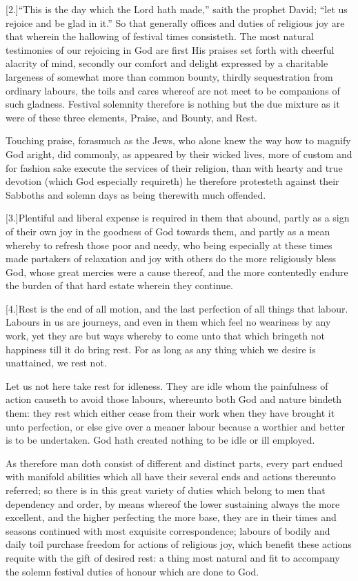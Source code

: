 [2.]“This is the day which the Lord hath made,” saith the prophet David; “let us rejoice and be glad in it.” So  that generally offices and duties of religious joy are that wherein the hallowing of festival times consisteth.
 The most natural testimonies of our rejoicing in God are first His praises set forth with cheerful alacrity of mind, secondly our comfort and delight expressed by a charitable largeness of somewhat more than common bounty, thirdly sequestration from ordinary labours, the toils and cares whereof are not meet to be companions of such gladness. Festival solemnity therefore is nothing but the due mixture as it were of these three elements, Praise, and Bounty, and Rest.

Touching praise, forasmuch as the Jews, who alone knew the way how to magnify God aright, did commonly, as appeared by their wicked lives, more of custom and for fashion sake execute the services of their religion, than with hearty and true devotion (which God especially requireth) he therefore protesteth against their Sabboths and solemn days as being therewith much offended.

[3.]Plentiful and liberal expense is required in them that abound, partly as a sign of their own joy in the goodness of God towards them, and partly as a mean whereby to refresh those poor and needy, who being especially at these times made partakers of relaxation and joy with others do the more religiously bless God, whose great mercies were a cause thereof, and the more contentedly endure the burden of that hard estate wherein they continue.

[4.]Rest is the end of all motion, and the last perfection of all things that labour. Labours in us are journeys, and even in them which feel no weariness by any work, yet they are but  ways whereby to come unto that which bringeth not happiness till it do bring rest.
 For as long as any thing which we desire is unattained, we rest not.

Let us not here take rest for idleness. They are idle whom the painfulness of action causeth to avoid those labours, whereunto both God and nature bindeth them: they rest which either cease from their work when they have brought it unto perfection, or else give over a meaner labour because a worthier and better is to be undertaken. God hath created nothing to be idle or ill employed.

As therefore man doth consist of different and distinct parts, every part endued with manifold abilities which all have their several ends and actions thereunto referred; so there is in this great variety of duties which belong to men that dependency and order, by means whereof the lower sustaining always the more excellent, and the higher perfecting the more base, they are in their times and seasons continued with most exquisite correspondence; labours of bodily and daily toil purchase freedom for actions of religious joy, which benefit these actions requite with the gift of desired rest: a thing most natural and fit to accompany the solemn festival duties of honour which are done to God.

